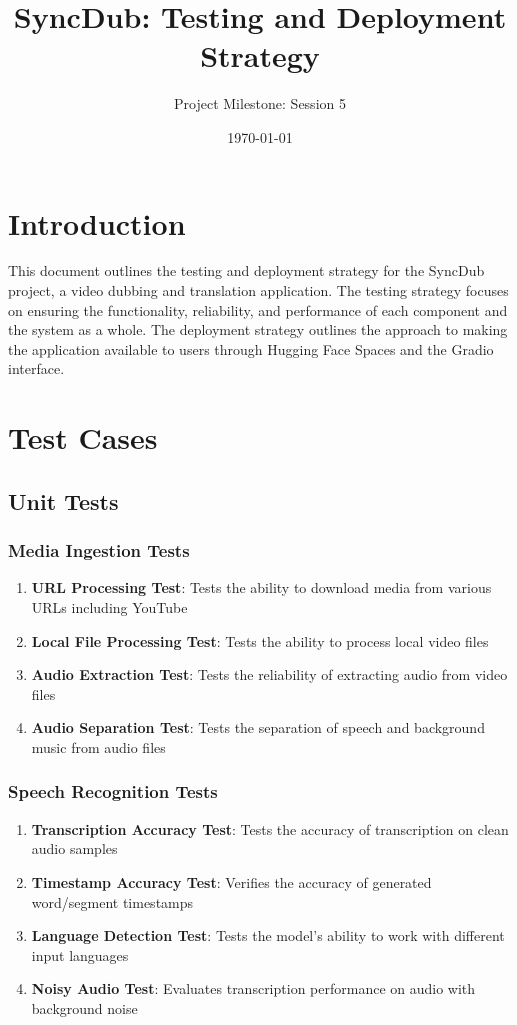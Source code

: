 \documentclass[11pt,a4paper]{article}
\title{SyncDub: Testing and Deployment Strategy}
\author{Project Milestone: Session 5}
\date{\today}
\begin{document}
\maketitle
\tableofcontents

\section{Introduction}

This document outlines the testing and deployment strategy for the SyncDub project, a video dubbing and translation application. The testing strategy focuses on ensuring the functionality, reliability, and performance of each component and the system as a whole. The deployment strategy outlines the approach to making the application available to users through Hugging Face Spaces and the Gradio interface.

\section{Test Cases}

\subsection{Unit Tests}

\subsubsection{Media Ingestion Tests}
\begin{enumerate}[label=UI\arabic*]
    \item \textbf{URL Processing Test}: Tests the ability to download media from various URLs including YouTube
    \item \textbf{Local File Processing Test}: Tests the ability to process local video files
    \item \textbf{Audio Extraction Test}: Tests the reliability of extracting audio from video files
    \item \textbf{Audio Separation Test}: Tests the separation of speech and background music from audio files
\end{enumerate}

\subsubsection{Speech Recognition Tests}
\begin{enumerate}[label=SR\arabic*]
    \item \textbf{Transcription Accuracy Test}: Tests the accuracy of transcription on clean audio samples
    \item \textbf{Timestamp Accuracy Test}: Verifies the accuracy of generated word/segment timestamps
    \item \textbf{Language Detection Test}: Tests the model's ability to work with different input languages
    \item \textbf{Noisy Audio Test}: Evaluates transcription performance on audio with background noise
\end{enumerate}
\end{document}
